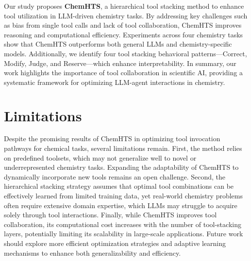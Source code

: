 
Our study proposes \textbf{ChemHTS}, a hierarchical tool stacking method to enhance tool utilization in LLM-driven chemistry tasks. By addressing key challenges such as bias from single tool calls and lack of tool collaboration, ChemHTS improves reasoning and computational efficiency.
Experiments across four chemistry tasks show that ChemHTS outperforms both general LLMs and chemistry-specific models. Additionally, we identify four tool stacking behavioral patterns—Correct, Modify, Judge, and Reserve—which enhance interpretability.
In summary, our work highlights the importance of tool collaboration in scientific AI, providing a systematic framework for optimizing LLM-agent interactions in chemistry.

\section*{Limitations}
Despite the promising results of ChemHTS in optimizing tool invocation pathways for chemical tasks, several limitations remain. First, the method relies on predefined toolsets, which may not generalize well to novel or underrepresented chemistry tasks. Expanding the adaptability of ChemHTS to dynamically incorporate new tools remains an open challenge. Second, the hierarchical stacking strategy assumes that optimal tool combinations can be effectively learned from limited training data, yet real-world chemistry problems often require extensive domain expertise, which LLMs may struggle to acquire solely through tool interactions. Finally, while ChemHTS improves tool collaboration, its computational cost increases with the number of tool-stacking layers, potentially limiting its scalability in large-scale applications. Future work should explore more efficient optimization strategies and adaptive learning mechanisms to enhance both generalizability and efficiency.
